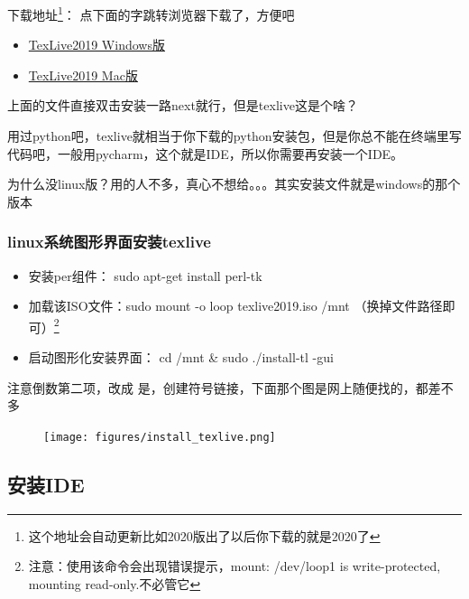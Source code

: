 \documentclass[AutoFakeBold]{LZUThesis2007}
\begin{document}
下载地址\footnote{这个地址会自动更新比如2020版出了以后你下载的就是2020了}： 点下面的字跳转浏览器下载了，方便吧

\begin{itemize}
	\item \href{https://mirrors.tuna.tsinghua.edu.cn/CTAN/systems/texlive/Images/texlive.iso}{TexLive2019 \quad Windows版}
	\item \href{http://tug.org/cgi-bin/mactex-download/MacTeX.pkg}{TexLive2019 \quad Mac版}
\end{itemize}

上面的文件直接双击安装一路next就行，但是texlive这是个啥？

用过python吧，texlive就相当于你下载的python安装包，但是你总不能在终端里写代码吧，一般用pycharm，这个就是IDE，所以你需要再安装一个IDE。


为什么没linux版？用的人不多，真心不想给。。。其实安装文件就是windows的那个版本

\subsubsection{linux系统图形界面安装texlive} %
\label{ssub:linux图形界面安装方式}

\begin{itemize}
	\item[1. ] 安装per组件： sudo apt-get install perl-tk
	\item[2. ] 加载该ISO文件：sudo mount -o loop texlive2019.iso /mnt （换掉文件路径即可）\footnote{注意：使用该命令会出现错误提示，mount: /dev/loop1 is write-protected, mounting read-only.不必管它}
	\item[3. ]启动图形化安装界面： cd /mnt \& sudo ./install-tl -gui
\end{itemize}

注意倒数第二项，改成 是，创建符号链接，下面那个图是网上随便找的，都差不多

\begin{figure}[H]
    \centering
    \texttt{[image: figures/install\_texlive.png]}
    
    \label{fig_install_texlive}
\end{figure}





\subsection{安装IDE} %
\label{sub:安装ide}
\end{document}
